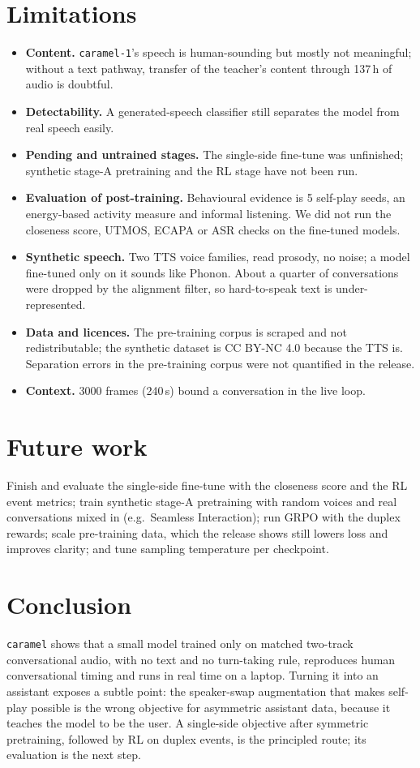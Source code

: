 \documentclass[10pt]{article}
\newcommand{\caramel}{\texttt{caramel}}
\begin{document}
\section{Limitations}
\begin{itemize}\itemsep0pt
\item \textbf{Content.} \texttt{caramel-1}'s speech is human-sounding but mostly not meaningful; without a text pathway, transfer of the teacher's content through 137\,h of audio is doubtful.
\item \textbf{Detectability.} A generated-speech classifier still separates the model from real speech easily.
\item \textbf{Pending and untrained stages.} The single-side fine-tune was unfinished; synthetic stage-A pretraining and the RL stage have not been run.
\item \textbf{Evaluation of post-training.} Behavioural evidence is 5 self-play seeds, an energy-based activity measure and informal listening. We did not run the closeness score, UTMOS, ECAPA or ASR checks on the fine-tuned models.
\item \textbf{Synthetic speech.} Two TTS voice families, read prosody, no noise; a model fine-tuned only on it sounds like Phonon. About a quarter of conversations were dropped by the alignment filter, so hard-to-speak text is under-represented.
\item \textbf{Data and licences.} The pre-training corpus is scraped and not redistributable; the synthetic dataset is CC BY-NC 4.0 because the TTS is. Separation errors in the pre-training corpus were not quantified in the release.
\item \textbf{Context.} 3000 frames (240\,s) bound a conversation in the live loop.
\end{itemize}

\section{Future work}
Finish and evaluate the single-side fine-tune with the closeness score and the RL event metrics; train synthetic stage-A pretraining with random voices and real conversations mixed in (e.g.\ Seamless Interaction); run GRPO with the duplex rewards; scale pre-training data, which the release shows still lowers loss and improves clarity; and tune sampling temperature per checkpoint.

\section{Conclusion}
\caramel{} shows that a small model trained only on matched two-track conversational audio, with no text and no turn-taking rule, reproduces human conversational timing and runs in real time on a laptop. Turning it into an assistant exposes a subtle point: the speaker-swap augmentation that makes self-play possible is the wrong objective for asymmetric assistant data, because it teaches the model to be the user. A single-side objective after symmetric pretraining, followed by RL on duplex events, is the principled route; its evaluation is the next step.
\end{document}
